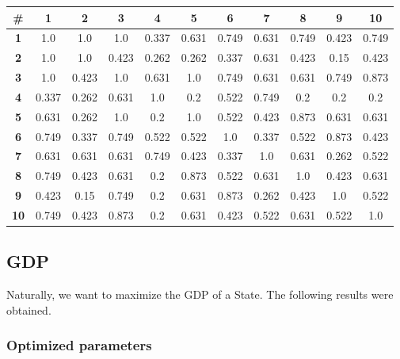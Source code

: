 \begin{table}[H]
    \centering
    \begin{tabular}{|c|c|c|c|c|c|c|c|c|c|c|}
        \hline
        \textbf{\#}& \textbf{1}& \textbf{2}& \textbf{3}& \textbf{4}& \textbf{5}& \textbf{6}& \textbf{7}& \textbf{8}& \textbf{9}& \textbf{10}\\ \hline
        \textbf{1}  & 1.0 & 1.0 & 1.0 & 0.337 & 0.631 & 0.749 & 0.631 & 0.749 & 0.423 & 0.749\\ \hline
        \textbf{2}  & 1.0 & 1.0 & 0.423 & 0.262 & 0.262 & 0.337 & 0.631 & 0.423 & 0.15 & 0.423\\ \hline
        \textbf{3}  & 1.0 & 0.423 & 1.0 & 0.631 & 1.0 & 0.749 & 0.631 & 0.631 & 0.749 & 0.873\\ \hline
        \textbf{4}  & 0.337 & 0.262 & 0.631 & 1.0 & 0.2 & 0.522 & 0.749 & 0.2 & 0.2 & 0.2\\ \hline
        \textbf{5}  & 0.631 & 0.262 & 1.0 & 0.2 & 1.0 & 0.522 & 0.423 & 0.873 & 0.631 & 0.631\\ \hline
        \textbf{6}  & 0.749 & 0.337 & 0.749 & 0.522 & 0.522 & 1.0 & 0.337 & 0.522 & 0.873 & 0.423\\ \hline
        \textbf{7}  & 0.631 & 0.631 & 0.631 & 0.749 & 0.423 & 0.337 & 1.0 & 0.631 & 0.262 & 0.522\\ \hline
        \textbf{8}  & 0.749 & 0.423 & 0.631 & 0.2 & 0.873 & 0.522 & 0.631 & 1.0 & 0.423 & 0.631\\ \hline
        \textbf{9}  & 0.423 & 0.15 & 0.749 & 0.2 & 0.631 & 0.873 & 0.262 & 0.423 & 1.0 & 0.522\\ \hline
        \textbf{10}  & 0.749 & 0.423 & 0.873 & 0.2 & 0.631 & 0.423 & 0.522 & 0.631 & 0.522 & 1.0\\ \hline
    \end{tabular}
\end{table}
            
        

    \subsection{GDP}

        Naturally, we want to maximize the GDP of a State. The following results were obtained.
    
        \subsubsection{Optimized parameters}

